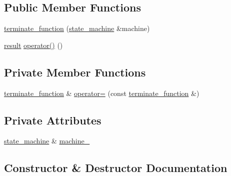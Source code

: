 \subsection*{Public Member Functions}
\begin{DoxyCompactItemize}
\item 
\mbox{\hyperlink{classboost_1_1statechart_1_1state__machine_1_1terminate__function_a135aed2e29092b7c0fcd3aa021e72bda}{terminate\+\_\+function}} (\mbox{\hyperlink{classboost_1_1statechart_1_1state__machine}{state\+\_\+machine}} \&machine)
\item 
\mbox{\hyperlink{namespaceboost_1_1statechart_abe807f6598b614d6d87bb951ecd92331}{result}} \mbox{\hyperlink{classboost_1_1statechart_1_1state__machine_1_1terminate__function_acb8264a868bd58d3495d50ac6b363714}{operator()}} ()
\end{DoxyCompactItemize}
\subsection*{Private Member Functions}
\begin{DoxyCompactItemize}
\item 
\mbox{\hyperlink{classboost_1_1statechart_1_1state__machine_1_1terminate__function}{terminate\+\_\+function}} \& \mbox{\hyperlink{classboost_1_1statechart_1_1state__machine_1_1terminate__function_aa24201446de919d035f3d1a656623c22}{operator=}} (const \mbox{\hyperlink{classboost_1_1statechart_1_1state__machine_1_1terminate__function}{terminate\+\_\+function}} \&)
\end{DoxyCompactItemize}
\subsection*{Private Attributes}
\begin{DoxyCompactItemize}
\item 
\mbox{\hyperlink{classboost_1_1statechart_1_1state__machine}{state\+\_\+machine}} \& \mbox{\hyperlink{classboost_1_1statechart_1_1state__machine_1_1terminate__function_a55aa5484f0cfd3516967e91b34653ae6}{machine\+\_\+}}
\end{DoxyCompactItemize}


\subsection{Constructor \& Destructor Documentation}
\mbox{\label{classboost_1_1statechart_1_1state__machine_1_1terminate__function_a135aed2e29092b7c0fcd3aa021e72bda}} 

